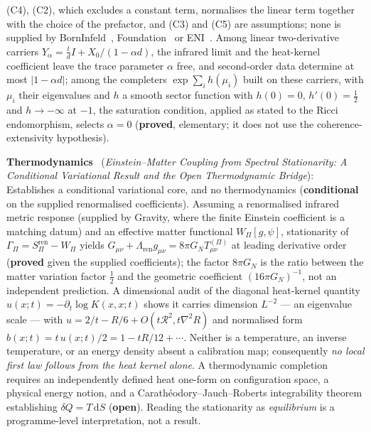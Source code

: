 \documentclass[11pt,a4paper]{article}
\newcommand{\sproved}{\textcolor{cproved}{\textbf{proved}}}
\newcommand{\sopen}{\textcolor{copen}{\textbf{open}}}
\newcommand{\scond}{\textcolor{ccond}{\textbf{conditional}}}
\begin{document}
    (C4), (C2), which excludes a constant term, normalises the linear term together with the choice of the
    prefactor, and (C3) and (C5) are assumptions; none is supplied by
    BornInfeld~\cite{Beau2026c}, Foundation~\cite{Beau2026m} or ENI~\cite{Beau2026l}.
    Among linear two-derivative carriers $Y_\alpha = \tfrac{t}{d}I + X_0/(1-\alpha d)$, the infrared limit and the
    heat-kernel coefficient leave the trace parameter $\alpha$ free, and second-order data determine at most
    $|1-\alpha d|$; among the completers $\exp\sum_i h(\mu_i)$ built on these carriers, with $\mu_i$ their
    eigenvalues and $h$ a smooth sector function with $h(0)=0$, $h'(0)=\tfrac12$ and $h\to-\infty$ at $-1$, the
    saturation condition, applied as stated to the Ricci
    endomorphism, selects $\alpha = 0$ (\sproved, elementary; it does not use the coherence-extensivity hypothesis).

    \textbf{Thermodynamics}~\cite{Beau2026Thermodynamics} (\emph{Einstein--Matter Coupling from
    Spectral Stationarity: A Conditional Variational Result and the Open Thermodynamic Bridge}):
    Establishes a conditional variational core, and no thermodynamics (\scond{} on the supplied renormalised
    coefficients).
    Assuming a renormalised infrared metric response (supplied by Gravity,
    where the finite Einstein coefficient is a matching datum) and an effective matter functional
    $W_\Pi[g,\psi]$, stationarity of $\Gamma_\Pi = S_\Pi^{\mathrm{ren}} - W_\Pi$ yields
    $G_{\mu\nu} + \Lambda_{\mathrm{ren}}g_{\mu\nu} = 8\pi G_N T^{(\Pi)}_{\mu\nu}$ at leading derivative order
    (\sproved{} given the supplied coefficients); the factor $8\pi G_N$ is the ratio between the matter
    variation factor $\tfrac{1}{2}$ and the geometric coefficient $(16\pi G_N)^{-1}$, not an independent
    prediction. A dimensional audit of the diagonal heat-kernel quantity
    $u(x;t) = -\partial_t\log K(x,x;t)$ shows it carries dimension $L^{-2}$ — an eigenvalue scale — with
    $u = 2/t - R/6 + O(t\mathcal{R}^2, t\nabla^2 R)$ and normalised form
    $b(x;t) = t\,u(x;t)/2 = 1 - tR/12 + \cdots$. Neither is a temperature, an inverse temperature, or an energy
    density absent a calibration map; consequently \emph{no local first law follows from the heat kernel alone}.
    A thermodynamic
    completion requires an independently defined heat one-form on configuration space, a physical energy notion,
    and a Carath\'{e}odory--Jauch--Roberts integrability theorem establishing $\delta Q = T\,\mathrm{d}S$
    (\sopen). Reading the stationarity as \emph{equilibrium} is a programme-level interpretation, not a result.
\end{document}
